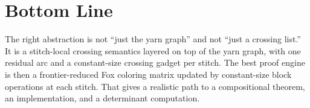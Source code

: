 \documentclass[11pt]{article}
\begin{document}
\section*{Bottom Line}
The right abstraction is not ``just the yarn graph'' and not ``just a crossing list.'' It is a stitch-local crossing semantics layered on top of the yarn graph, with one residual arc and a constant-size crossing gadget per stitch. The best proof engine is then a frontier-reduced Fox coloring matrix updated by constant-size block operations at each stitch. That gives a realistic path to a compositional theorem, an implementation, and a determinant computation.
\end{document}
